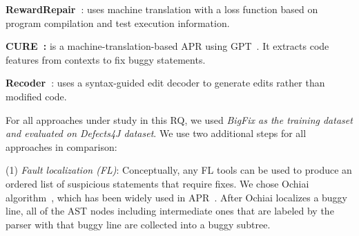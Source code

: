 
{\bf RewardRepair~\cite{monperrus-icse22}}: uses machine translation
with a loss function based on program compilation and test execution
information.




{\bf CURE~\cite{cure-icse21}:} is a machine-translation-based APR
using GPT~\cite{radford2018improving}.
It extracts code features from contexts to fix buggy statements.





{\bf Recoder~\cite{recoder-fse21}}: uses a syntax-guided edit decoder
to generate edits rather than modified code.


For all approaches under study in this RQ, we used {\em BigFix as the
training dataset and evaluated on Defects4J dataset}. 
We use two additional steps for all approaches in comparison:

(1) {\em Fault localization (FL)}: Conceptually, any FL
tools can be used to produce an ordered list of suspicious
statements that require fixes. We chose Ochiai
algorithm~\cite{abreu2006evaluation, pearson2017evaluating}, which has
been widely used in
APR~\cite{jiang2018shaping,xiong2017precise,koyuncu2018fixminer,xin2017leveraging,wen2018context,liu2018lsrepair}.
After Ochiai localizes a buggy line, all of the AST nodes including
intermediate ones that are labeled by the parser with that buggy line
are collected into a buggy subtree.

